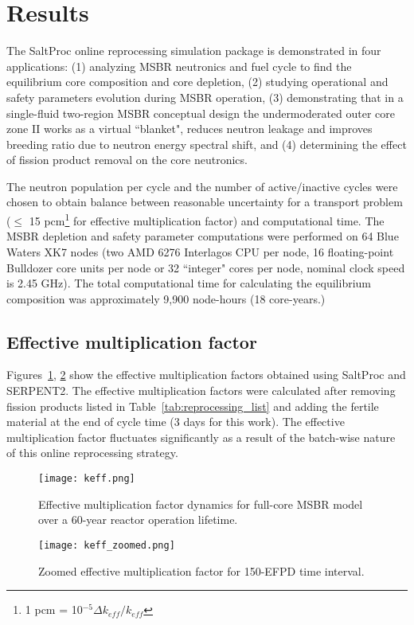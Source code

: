 \section{Results}
The SaltProc online reprocessing simulation package is demonstrated in four 
applications: (1) analyzing  \gls{MSBR} neutronics and fuel cycle to find the 
equilibrium core composition and core depletion, (2) studying operational and 
safety parameters evolution during \gls{MSBR} operation, (3) demonstrating that 
in a single-fluid two-region \gls{MSBR} conceptual design the undermoderated 
outer core zone II works as a virtual ``blanket", reduces neutron leakage and 
improves breeding ratio due to neutron energy spectral shift, and (4) 
determining the effect of fission product removal on the core neutronics.

The neutron population per cycle and the number of active/inactive cycles were 
chosen to obtain balance between reasonable uncertainty for a transport problem 
($\leq$ 15 pcm\footnote{ 1 pcm = 10$^{-5}\Delta k_{eff}/k_{eff}$} for effective 
multiplication factor) and computational time. The \gls{MSBR} depletion and 
safety parameter computations were performed on 64 Blue Waters XK7 nodes (two 
AMD 6276 Interlagos CPU per node, 16 floating-point Bulldozer core units per 
node or 32 ``integer" cores per node, nominal clock speed is 2.45 GHz). The 
total computational time for calculating the equilibrium composition was 
approximately 9,900 node-hours (18 core-years.)

\subsection{Effective multiplication factor}
Figures~\ref{fig:keff}, \ref{fig:keff_zoomed} show the effective multiplication factors 
obtained using SaltProc and SERPENT2. The effective multiplication factors were 
calculated after removing fission products listed in 
Table~\ref{tab:reprocessing_list} and adding the fertile material at the end of 
cycle time (3 days for this work). The effective multiplication 
factor fluctuates significantly as a result of the batch-wise nature of this 
online reprocessing strategy. 

\begin{figure}[ht!] 
  \centering
  \texttt{[image: keff.png]}
  \caption{Effective multiplication factor dynamics for full-core \gls{MSBR} 
  model over a 60-year reactor operation lifetime.}
  \label{fig:keff}
\end{figure}
\begin{figure}[ht!] 
  \centering
  \texttt{[image: keff\_zoomed.png]}
  \caption{Zoomed effective multiplication factor for 150-EFPD time interval.}
  \label{fig:keff_zoomed}
\end{figure}


